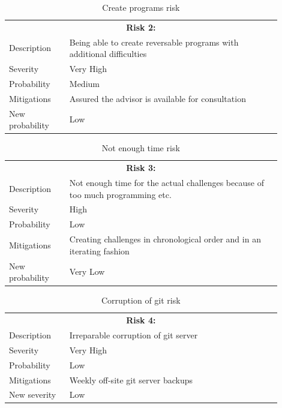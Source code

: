 \vspace{2.5cm}

\begin{table}[H]
  \centering
  \begin{tabular}{|p{0.2\linewidth}p{0.7\linewidth}|}
    \hline
    \multicolumn{2}{|c|}{\textbf{Risk 2:}} \\
    Description     & Being able to create reversable programs with additional difficulties           \\
    Severity        & Very High                                 \\
    Probability     & Medium                                   \\
    Mitigations     & Assured the advisor is available for consultation  \\
    New probability & Low       \\
    \hline                            
  \end{tabular}
  \caption{Create programs risk}
\end{table}

\vspace{2.5cm}

\begin{table}[H]
  \centering
  \begin{tabular}{|p{0.2\linewidth}p{0.7\linewidth}|}
    \hline
    \multicolumn{2}{|c|}{\textbf{Risk 3:}} \\
    Description            & Not enough time for the actual challenges because of too much programming etc.           \\
    Severity        & High                                 \\
    Probability     & Low                                   \\
    Mitigations     & Creating challenges in chronological order and in an iterating fashion  \\
    New probability & Very Low     \\
    \hline                              
  \end{tabular}
  \caption{Not enough time risk}
\end{table}

\newpage

\begin{table}[H]
  \centering
  \begin{tabular}{|p{0.2\linewidth}p{0.7\linewidth}|}
    \hline
    \multicolumn{2}{|c|}{\textbf{Risk 4:}} \\
    Description     & Irreparable corruption of git server           \\
    Severity        & Very High                                 \\
    Probability     & Low                                   \\
    Mitigations     & Weekly off-site git server backups  \\
    New severity    & Low      \\
    \hline                             
  \end{tabular}
  \caption{Corruption of git risk}
\end{table}

